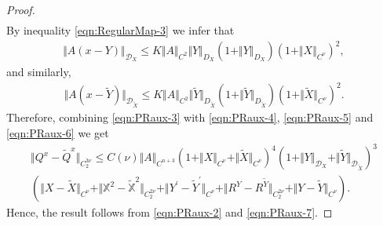 \documentclass[11pt,a4paper,reqno]{amsart}%
\theoremstyle{plain}
\theoremstyle{remark}
\theoremstyle{plain}
\numberwithin{equation}{section}
\begin{document}
\begin{proof}
\begin{align}
\end{align}
By inequality \eqref{eqn:RegularMap-3} we infer that
\begin{eqnarray}
\Vert A(x-Y)\Vert_{\mathcal{D}_X}\leq
K\Vert A\Vert_{C^2}\Vert Y\Vert_{D_X}(1+\Vert Y\Vert_{D_X})(1+\Vert X\Vert_{C^{\nu}})^2,\label{eqn:PRaux-5}
\end{eqnarray}
and similarly,
\begin{eqnarray}
\Vert A(x-\tilde{Y})\Vert_{\mathcal{D}_{\tilde{X}}}\leq
K\Vert A\Vert_{C^2}\Vert \tilde{Y}\Vert_{D_{\tilde{X}}}(1+\Vert \tilde{Y}\Vert_{D_{\tilde{X}}})(1+\Vert \tilde{X}\Vert_{C^{\nu}})^2.\label{eqn:PRaux-6}
\end{eqnarray}
Therefore, combining \eqref{eqn:PRaux-3} with \eqref{eqn:PRaux-4},
\eqref{eqn:PRaux-5} and \eqref{eqn:PRaux-6} we get
\begin{multline}\label{eqn:PRaux-7}
\Vert Q^x-\tilde{Q}^x\Vert_{C_2^{3\nu}}\leq C(\nu)\Vert A\Vert_{C^{n+3}}(1+\Vert X\Vert_{C^{\nu}}+\Vert \tilde{X}\Vert_{C^{\nu}})^4(1+\Vert Y\Vert_{\mathcal{D}_X}+\Vert \tilde{Y}\Vert_{\mathcal{D}_{\tilde{X}}})^3\\
(\Vert X-\tilde{X}\Vert_{C^{\nu}}+\Vert \mathbb{X}^2-\mathbb{\tilde{X}}^2\Vert_{C_2^{2\nu}}+\Vert Y^\prime-\tilde{Y}^\prime\Vert_{C^{\nu}}+\Vert R^Y-R^{\tilde{Y}}\Vert_{C_2^{2\nu}}+\Vert Y-\tilde{Y}\Vert_{C^{\nu}}).
\end{multline}
Hence, the result follows from \eqref{eqn:PRaux-2} and
\eqref{eqn:PRaux-7}.
\end{proof}
\end{document}

